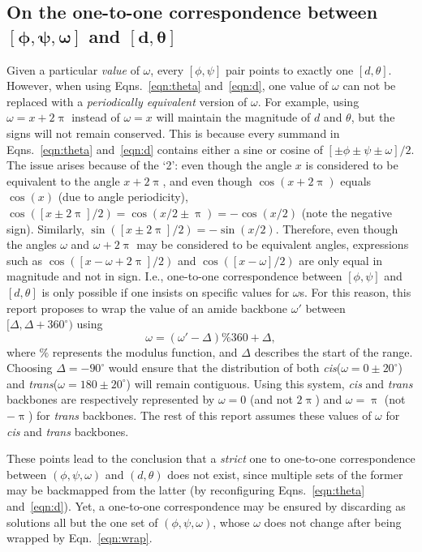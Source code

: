 \documentclass[fleqn,10pt,lineno]{wlpeerj} %
\newcommand{\n}[1]{{\color{black}#1}} %
\newcommand{\Eqn}[1]{Eqn.~\ref{#1}}
\newcommand{\Eqns}[1]{Eqns.~\ref{#1}}
\newcommand{\cis}{{\em cis}\xspace}
\newcommand{\trans}{{\em trans}\xspace}
\begin{document}
\subsection*{\n{On the one-to-one correspondence between $\bm{[\phi,\psi,\omega]}$ and $\bm{[d,\theta]}$}}
\n{Given a particular {\it value} of $\omega$, every $[\phi,\psi]$ pair points to exactly one $[d,\theta]$. However, when using \Eqns{eqn:theta} and~\ref{eqn:d}, one value of $\omega$ can not be replaced with a {\em periodically equivalent} version of $\omega$. For example, using $\omega=x+2\uppi$ instead of $\omega=x$ will maintain the magnitude of $d$ and $\theta$, but the signs will not remain conserved. This is because every summand in \Eqns{eqn:theta} and~\ref{eqn:d} contains either a sine or cosine of $[\pm\phi \pm\psi \pm\omega]/2$. The issue arises because of the `2': even though the angle $x$ is considered to be equivalent to the angle $x+2\uppi$, and even though $\cos(x+2\uppi)$ equals $\cos(x)$ (due to angle periodicity), $\cos([x \pm 2\uppi]/2) = \cos(x/2 \pm \uppi) = -\cos(x/2)$ (note the negative sign). Similarly, $\sin([x \pm 2\uppi]/2) = -\sin(x/2)$. Therefore, even though the angles $\omega$ and $\omega+2\uppi$ may be considered to be equivalent angles, expressions such as $\cos([x-\omega + 2\uppi]/2)$ and $\cos([x-\omega]/2)$ are only equal in magnitude and not in sign. I.e., one-to-one correspondence between $[\phi,\psi]$ and $[d,\theta]$ is only possible if one insists on specific values for $\omega$s. For this reason, this report proposes to wrap the value of an amide backbone  $\omega'$ between $[\Delta,\Delta+360^\circ)$ using 
\begin{equation}
\label{eqn:wrap}
\omega = ( \omega' - \Delta ) \% 360 + \Delta,
\end{equation}
where $\%$ represents the modulus function, and $\Delta$ describes the start of the range. Choosing $\Delta=-90^\circ$ would ensure that the distribution of both \cis ($\omega = 0 \pm 20^\circ$) and \trans ($\omega = 180\pm 20^\circ$)  will remain contiguous. %
Using this system, \cis and \trans backbones are respectively represented by $\omega=0$ (and not $2\uppi$) and $\omega=\uppi$ (not $-\uppi$) for \trans backbones. The rest of this report assumes these values of $\omega$ for \cis and \trans backbones.

These points lead to the conclusion that a {\em strict} one to one-to-one correspondence between $(\phi,\psi,\omega)$ and $(d,\theta)$ does not exist, since multiple sets of the former may be backmapped from the latter (by reconfiguring \Eqns{eqn:theta} and~\ref{eqn:d}). Yet, a one-to-one correspondence may be ensured by discarding as solutions all but the one set of $(\phi,\psi,\omega)$, whose $\omega$ does not change after being wrapped by \Eqn{eqn:wrap}.}
\end{document}
